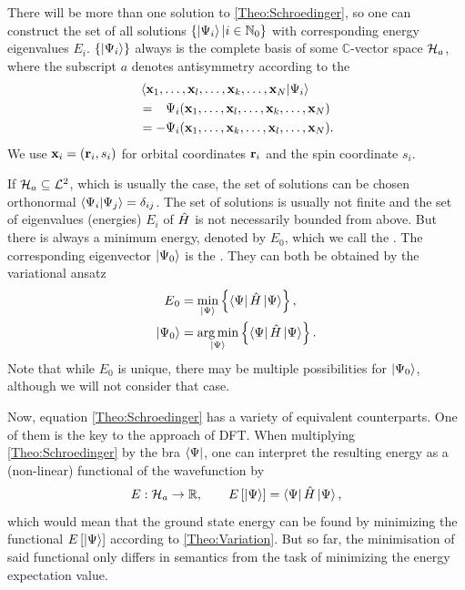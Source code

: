 \documentclass[8.5pt,twoside,twocolumn]{article}
\renewcommand\Hil{\enmat{\mathcal H_a}}
\renewcommand\r{\bo r}
\theoremstyle{standard}
\begin{document}
There will be more than one solution to \eqref{Theo:Schroedinger}, so one can construct the set of all solutions $\left\{{\left|\Psi{_i}\right\rangle | i \in \mathbb{N}_0} \right\}$
with corresponding energy eigenvalues $E_i$. $\left\{{\left|\Psi{_i}\right\rangle} \right\}$ always is the complete basis of
some $\mathbb C$-vector space $\Hil$, where the subscript $a$ denotes antisymmetry according 
to the 
\begin{equation}
\begin{aligned}
 &\bkt{\x_1,\ldots,\x_l,\ldots,\x_k,\ldots,\x_N | \Psi_i } \\
 &=\ph - \Psi_i(\x_1,\ldots,\x_l,\ldots,\x_k,\ldots,\x_N) \\
 &= - \Psi_i(\x_1,\ldots,\x_k,\ldots,\x_l,\ldots,\x_N).
\end{aligned}
\label{Theo:Pauli}
\end{equation}
We use $\x_i=(\r_i,s_i)$ for orbital coordinates $\r_i$ and the spin coordinate $s_i$.

 If $\Hil \suseq \mathcal {L}^2$, which is usually the case,
the set of solutions can be chosen orthonormal $\left\langle{\Psi_i | \Psi_j}\right\rangle = \delta_{ij}$.
The set of solutions is usually not finite and the set of eigenvalues (energies) $E_i$ of $\hat{H}$
is not necessarily bounded from above. But there is always a minimum energy, denoted by $E_0$, 
which we call the . The corresponding eigenvector 
$\left|\Psi{_0}\right\rangle$ is the . They can both be obtained by the
variational ansatz
\begin{equation}
\begin{aligned}
 E{_0}&= \min_{\left|\Psi{}\right\rangle} \left\{{ \left\langle\Psi{}\right| \hat{H} \left|\Psi{}\right\rangle} \right\}, \\
 \left|\Psi{_0}\right\rangle&= \operatorname*{arg\,min}_{\left|\Psi{}\right\rangle} \left\{{ \left\langle\Psi{}\right| \hat{H} \left|\Psi{}\right\rangle} \right\}.
\end{aligned}
\label{Theo:Variation}
\end{equation}
Note that while $E_0$ is unique, there may be multiple possibilities for $\left|\Psi{_0}\right\rangle$, although
we will not consider that case.

Now, equation \eqref{Theo:Schroedinger} has a variety of equivalent counterparts. One of them
is the key to the approach of DFT. When multiplying \eqref{Theo:Schroedinger} by the bra $\left\langle\Psi{}\right|$,
one can interpret the resulting energy as a (non-linear) functional of the wavefunction by
\begin{equation}
 E : \Hil \rar \R, \qquad E\ed{\keP{}}=\brP{} \Ha \keP{},
 \label{Theo:WaveFunctional}
\end{equation}
which would mean that the ground state energy can be found by minimizing the functional
$E\left[{\left|\Psi{}\right\rangle}\right]$ according to \eqref{Theo:Variation}. But so far, the minimisation
of said functional only differs in semantics from the task of minimizing the energy expectation value.
\end{document}
